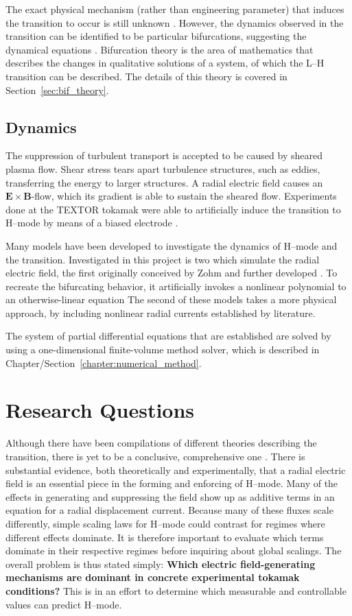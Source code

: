 The exact physical mechanism (rather than engineering parameter) that induces the transition to occur is still unknown \cite{itoh_structural_2016}.
However, the dynamics observed in the transition can be identified to be particular bifurcations, suggesting the dynamical equations \cite{weymiens_bifurcation_2012}.
Bifurcation theory is the area of mathematics that describes the changes in qualitative solutions of a system, of which the L--H transition can be described.
The details of this theory is covered in Section~\ref{sec:bif_theory}.

\subsection{Dynamics}\label{ssec:dynamics}
The suppression of turbulent transport is accepted to be caused by sheared plasma flow.
Shear stress tears apart turbulence structures, such as eddies, transferring the energy to larger structures.
A radial electric field causes an $\mathbf{E}\times\mathbf{B}$-flow, which its gradient is able to sustain the sheared flow.
Experiments done at the TEXTOR tokamak were able to artificially induce the transition to H--mode by means of a biased electrode \cite{weynants_confinement_1992}.

Many models have been developed to investigate the dynamics of H--mode and the transition.
Investigated in this project is two which simulate the radial electric field, the first originally conceived by Zohm \cite{zohm_dynamic_1994} and further developed \cite{paquay_studying_2012} \cite{weymiens_bifurcation_2014}.
To recreate the bifurcating behavior, it artificially invokes a nonlinear polynomial to an otherwise-linear equation
The second of these models takes a more physical approach, by including nonlinear radial currents established by literature.

The system of partial differential equations that are established are solved by using a one-dimensional finite-volume method solver, which is described in Chapter/Section~\ref{chapter:numerical_method}.

\section{Research Questions}\label{sec:research_questions}
Although there have been compilations of different theories describing the transition, there is yet to be a conclusive, comprehensive one \cite{connor_review_2000}.
There is substantial evidence, both theoretically and experimentally, that a radial electric field is an essential piece in the forming and enforcing of H--mode.
Many of the effects in generating and suppressing the field show up as additive terms in an equation for a radial displacement current.
Because many of these fluxes scale differently, simple scaling laws for H--mode could contrast for regimes where different effects dominate.
It is therefore important to evaluate which terms dominate in their respective regimes before inquiring about global scalings.
The overall problem is thus stated simply: \textbf{Which electric field-generating mechanisms are dominant in concrete experimental tokamak conditions?}
This is in an effort to determine which measurable and controllable values can predict H--mode.

